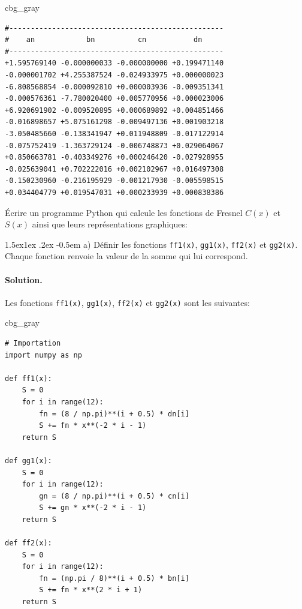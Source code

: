 \documentclass[%
oneside,                 %
final,                   %
10pt,french]{article}
\makeatletter
\newenvironment{_cod_tight}[1]{
   \def\FrameCommand{\colorbox{#1}}
   \FrameRule0.6pt\MakeFramed {\FrameRestore}\vskip3mm}
   {\vskip0mm\endMakeFramed}
\newenvironment{cod}[1]{
\bgroup\rmfamily
\fboxsep=0mm\relax
\begin{_cod_tight}{#1}
\list{}{\parsep=-2mm\parskip=0mm\topsep=0pt\leftmargin=2mm
\rightmargin=2\leftmargin\leftmargin=4pt\relax}
\item\relax}
{\endlist\end{_cod_tight}\egroup}
\newenvironment{doconceexercise}{}{}
\newcommand\subex{\@startsection{paragraph}{4}{\z@}%
                  {1.5ex\@plus1ex \@minus.2ex}%
                  {-0.5em}%
                  {\normalfont\normalsize\bfseries}}
\makeatother
\begin{document}
\begin{doconceexercise}
\begin{cod}{cbg_gray}\begin{verbatim}
#--------------------------------------------------
#    an            bn          cn           dn
#--------------------------------------------------
+1.595769140 -0.000000033 -0.000000000 +0.199471140
-0.000001702 +4.255387524 -0.024933975 +0.000000023
-6.808568854 -0.000092810 +0.000003936 -0.009351341
-0.000576361 -7.780020400 +0.005770956 +0.000023006
+6.920691902 -0.009520895 +0.000689892 +0.004851466
-0.016898657 +5.075161298 -0.009497136 +0.001903218
-3.050485660 -0.138341947 +0.011948809 -0.017122914
-0.075752419 -1.363729124 -0.006748873 +0.029064067
+0.850663781 -0.403349276 +0.000246420 -0.027928955
-0.025639041 +0.702222016 +0.002102967 +0.016497308
-0.150230960 -0.216195929 -0.001217930 -0.005598515
+0.034404779 +0.019547031 +0.000233939 +0.000838386
\end{verbatim}
\end{cod}
\noindent


Écrire un programme Python qui calcule les fonctions de Fresnel $C(x)$ et $S(x)$ ainsi que leurs représentations graphiques:


\subex{a)}
Définir les fonctions \texttt{ff1(x)}, \texttt{gg1(x)}, \texttt{ff2(x)} et \texttt{gg2(x)}. Chaque fonction renvoie la valeur de la somme qui lui correspond.


\paragraph{Solution.}
Les fonctions \texttt{ff1(x)}, \texttt{gg1(x)}, \texttt{ff2(x)} et \texttt{gg2(x)} sont les suivantes:
\begin{cod}{cbg_gray}\begin{verbatim}
# Importation
import numpy as np

def ff1(x):
    S = 0
    for i in range(12):
        fn = (8 / np.pi)**(i + 0.5) * dn[i]
        S += fn * x**(-2 * i - 1)
    return S

def gg1(x):
    S = 0
    for i in range(12):
        gn = (8 / np.pi)**(i + 0.5) * cn[i]
        S += gn * x**(-2 * i - 1)
    return S

def ff2(x):
    S = 0
    for i in range(12):
        fn = (np.pi / 8)**(i + 0.5) * bn[i]
        S += fn * x**(2 * i + 1)
    return S


\end{verbatim}
\end{cod}
\end{doconceexercise}
\end{document}
